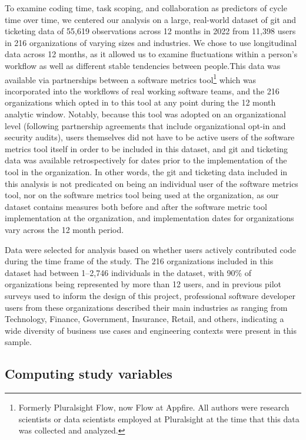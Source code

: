 \documentclass[
  sn-mathphys-ay,
]{sn-jnl}
\begin{document}
To examine coding time, task scoping, and collaboration as predictors of
cycle time over time, we centered our analysis on a large, real-world
dataset of git and ticketing data of 55,619 observations across 12
months in 2022 from 11,398 users in 216 organizations of varying sizes
and industries. We chose to use longitudinal data across 12 months, as
it allowed us to examine fluctuations within a person's workflow as well
as different stable tendencies between people.This data was available
via partnerships between a software metrics tool\footnote{Formerly
  Pluralsight Flow, now Flow at Appfire. All authors were research
  scientists or data scientists employed at Pluralsight at the time that
  this data was collected and analyzed.} which was incorporated into the
workflows of real working software teams, and the 216 organizations
which opted in to this tool at any point during the 12 month analytic
window. Notably, because this tool was adopted on an organizational
level (following partnership agreements that include organizational
opt-in and security audits), users themselves did not have to be active
users of the software metrics tool itself in order to be included in
this dataset, and git and ticketing data was available retrospectively
for dates prior to the implementation of the tool in the organization.
In other words, the git and ticketing data included in this analysis is
not predicated on being an individual user of the software metrics tool,
nor on the software metrics tool being used at the organization, as our
dataset contains measures both before and after the software metric tool
implementation at the organization, and implementation dates for
organizations vary across the 12 month period.

Data were selected for analysis based on whether users actively
contributed code during the time frame of the study. The 216
organizations included in this dataset had between 1--2,746 individuals
in the dataset, with 90\% of organizations being represented by more
than 12 users, and in previous pilot surveys used to inform the design
of this project, professional software developer users from these
organizations described their main industries as ranging from
Technology, Finance, Government, Insurance, Retail, and others,
indicating a wide diversity of business use cases and engineering
contexts were present in this sample.

\subsection{Computing study variables}\label{computing-study-variables}
\end{document}
